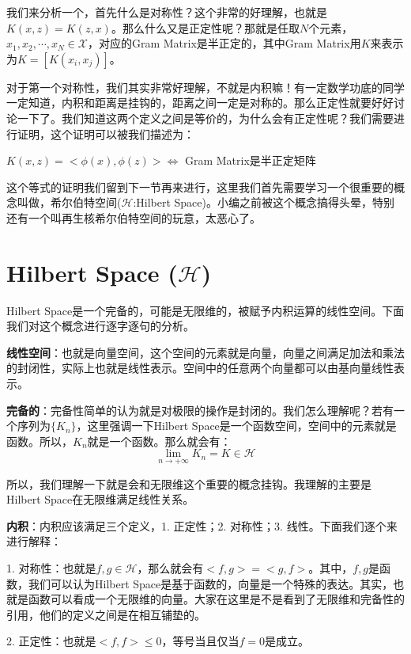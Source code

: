 \documentclass[a4paper]{article}
\begin{document}
我们来分析一个，首先什么是对称性？这个非常的好理解，也就是$K(x,z)=K(z,x)$。那么什么又是正定性呢？那就是任取$N$个元素，$x_1,x_2,\cdots,x_N\in \mathcal{X}$，对应的Gram Matrix是半正定的，其中Gram Matrix用$K$来表示为$K=[K(x_i,x_j)]$。

对于第一个对称性，我们其实非常好理解，不就是内积嘛！有一定数学功底的同学一定知道，内积和距离是挂钩的，距离之间一定是对称的。那么正定性就要好好讨论一下了。我们知道这两个定义之间是等价的，为什么会有正定性呢？我们需要进行证明，这个证明可以被我们描述为：
\begin{center}
    {\color{red}
    $K(x,z) = <\phi(x),\phi(z)> \Longleftrightarrow$ Gram Matrix是半正定矩阵
    }
\end{center}

这个等式的证明我们留到下一节再来进行，这里我们首先需要学习一个很重要的概念叫做，希尔伯特空间($\mathcal{H}$:Hilbert Space)。小编之前被这个概念搞得头晕，特别还有一个叫再生核希尔伯特空间的玩意，太恶心了。

\section{Hilbert Space ($\mathcal{H}$)}
{\color{red} Hilbert Space是一个完备的，可能是无限维的，被赋予内积运算的线性空间。}下面我们对这个概念进行逐字逐句的分析。

\textbf{线性空间}：也就是向量空间，这个空间的元素就是向量，向量之间满足加法和乘法的封闭性，实际上也就是线性表示。空间中的任意两个向量都可以由基向量线性表示。

\textbf{完备的}：完备性简单的认为就是对极限的操作是封闭的。我们怎么理解呢？若有一个序列为$\{K_n\}$，这里强调一下Hilbert Space是一个函数空间，空间中的元素就是函数。所以，$K_n$就是一个函数。那么就会有：
\begin{equation}
    \lim_{n\longrightarrow +\infty} K_n = K \in \mathcal{H}
\end{equation}

所以，我们理解一下就是会和无限维这个重要的概念挂钩。我理解的主要是Hilbert Space在无限维满足线性关系。

\textbf{内积}：内积应该满足三个定义，1. 正定性；2. 对称性；3. 线性。下面我们逐个来进行解释：

1. 对称性：也就是$f,g\in \mathcal{H}$，那么就会有$<f,g> = <g,f>$。其中，$f,g$是函数，我们可以认为Hilbert Space是基于函数的，向量是一个特殊的表达。其实，也就是函数可以看成一个无限维的向量。大家在这里是不是看到了无限维和完备性的引用，他们的定义之间是在相互铺垫的。

2. 正定性：也就是$<f,f> \leq 0$，等号当且仅当$f=0$是成立。
\end{document}
